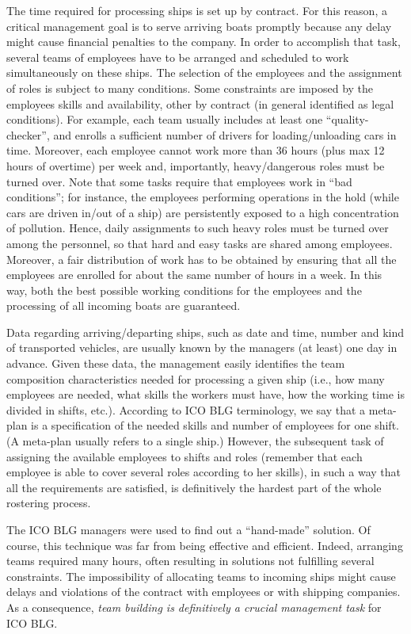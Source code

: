 \documentclass{tlp}
\begin{document}
The time required for processing ships is set up by contract.
For this reason, a critical management goal is  to  serve arriving boats promptly
because any delay might cause financial penalties to the company.
In order to accomplish that task, several teams of employees have
to be arranged and scheduled to  work simultaneously on these ships.
The selection of the employees and the assignment of roles is subject to many conditions.
Some constraints are imposed by the employees skills and availability,
other by contract (in general identified as legal conditions).
For example, each team usually includes at least one ``quality-checker'', and
enrolls a sufficient number of drivers for loading/unloading cars in time.
Moreover, each employee cannot work more than 36 hours (plus max 12 hours of overtime) per week
and, importantly, heavy/dangerous roles must be turned over.
Note that some tasks require that employees work in ``bad conditions'';
for instance, the employees performing operations in the hold (while cars are driven in/out
of a ship) are persistently exposed to a high concentration of pollution.
Hence, daily assignments to such heavy roles must be turned over among the personnel,
so that hard and easy tasks are shared among employees.
Moreover, a fair distribution of work has to be obtained by ensuring
that all the employees are enrolled for about the same number of hours in a week.
In this way, both the best possible working conditions for the employees
and the processing of all incoming boats are guaranteed.

Data regarding arriving/departing ships,
such as date and time, number and kind of transported vehicles,
are usually known by the managers (at least) one day in advance.
Given these data, the management easily identifies the team composition characteristics
needed for processing a given ship (i.e., how many employees are needed,
what skills the workers must have, how the working time is divided in shifts, etc.).
According to ICO BLG terminology, we say that a meta-plan is
a specification of the needed skills and number of employees for one shift.
(A meta-plan usually refers to a single ship.)
However, the subsequent task of assigning the available employees
to shifts and roles (remember that each employee is able to cover several roles according to her skills),
in such a way that all the requirements are satisfied,
is definitively the hardest part of the whole rostering process.

The ICO BLG managers were used to find out a ``hand-made'' solution.
Of course, this technique was far from being effective and efficient.
Indeed, arranging teams required many hours, often resulting in solutions not
fulfilling several constraints.
The impossibility of allocating teams to incoming ships might cause
delays and violations of the contract with employees or with shipping companies.
As a consequence, {\em team building is definitively a crucial management task} for ICO BLG.
\end{document}
